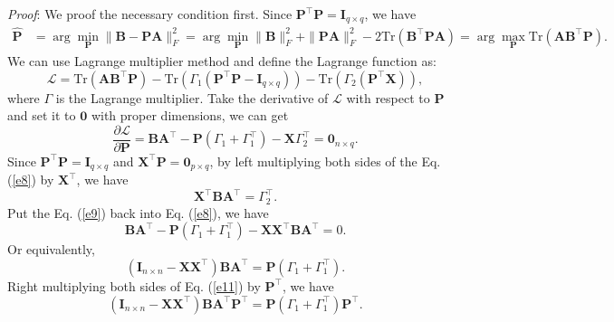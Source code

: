 \documentclass[titlepage,11pt,twoside]{article}
\begin{document}
\emph{Proof}:
We proof the necessary condition first. Since $\mathbf{P}^{\top}\mathbf{P} = \mathbf{I}_{q\times q}$, we have
\begin{equation}
\begin{split}
\mathbf{\hat{P}}
&
=\arg\min_{\mathbf{P}}\|\mathbf{B}-\mathbf{P}\mathbf{A}\|_{F}^{2}
=\arg\min_{\mathbf{P}}\|\mathbf{B}\|_{F}^{2}+\|\mathbf{P}\mathbf{A}\|_{F}^{2}-2\text{Tr}(\mathbf{B}^{\top}\mathbf{P}\mathbf{A})
=\arg\max_{\mathbf{P}}\text{Tr}(\mathbf{A}\mathbf{B}^{\top}\mathbf{P}).
\end{split}
\end{equation}
We can use Lagrange multiplier method and define the Lagrange function as:
\begin{equation}
\mathcal{L}
=
\text{Tr}(\mathbf{A}\mathbf{B}^{\top}\mathbf{P})
-
\text{Tr}(\Gamma_{1}(\mathbf{P}^{\top}\mathbf{P} - \mathbf{I}_{q\times q}))
-
\text{Tr}(\Gamma_{2}(\mathbf{P}^{\top}\mathbf{X}))
,
\end{equation}
where $\Gamma$ is the Lagrange multiplier. Take the derivative of $\mathcal{L}$ with respect to $\mathbf{P}$ and set it to $\mathbf{0}$ with proper dimensions, we can get
\begin{equation}\label{e8}
\frac{\partial \mathcal{L}}{\partial \mathbf{P}} 
=
\mathbf{B}\mathbf{A}^{\top}
-
\mathbf{P}(\Gamma_{1}+\Gamma_{1}^{\top})
-
\mathbf{X}\Gamma_{2}^{\top}
=
\mathbf{0}_{n\times q}.
\end{equation}
Since $\mathbf{P}^{\top}\mathbf{P}=\mathbf{I}_{q\times q}$ and $\mathbf{X}^{\top}\mathbf{P} = \mathbf{0}_{p\times q}$, by left multiplying both sides of the Eq. (\ref{e8}) by $\mathbf{X}^{\top}$, we have 
\begin{equation}\label{e9}
\mathbf{X}^{\top}\mathbf{B}\mathbf{A}^{\top}
=
\Gamma_{2}^{\top}.
\end{equation}
Put the Eq. (\ref{e9}) back into Eq. (\ref{e8}), we have 
\begin{equation}\label{e10}
\mathbf{B}\mathbf{A}^{\top}
-
\mathbf{P}(\Gamma_{1}+\Gamma_{1}^{\top})
-
\mathbf{X}\mathbf{X}^{\top}\mathbf{B}\mathbf{A}^{\top}
=
0.
\end{equation}
Or equivalently,
\begin{equation}\label{e11}
(\mathbf{I}_{n\times n}-\mathbf{X}\mathbf{X}^{\top})\mathbf{B}\mathbf{A}^{\top}
=
\mathbf{P}(\Gamma_{1}+\Gamma_{1}^{\top}).
\end{equation}
Right multiplying both sides of Eq. (\ref{e11}) by $\mathbf{P}^{\top}$, we have
\begin{equation}
(\mathbf{I}_{n\times n}-\mathbf{X}\mathbf{X}^{\top})\mathbf{B}\mathbf{A}^{\top}\mathbf{P}^{\top}
=
\mathbf{P}(\Gamma_{1}+\Gamma_{1}^{\top})\mathbf{P}^{\top}
.
\end{equation}
\end{document}
